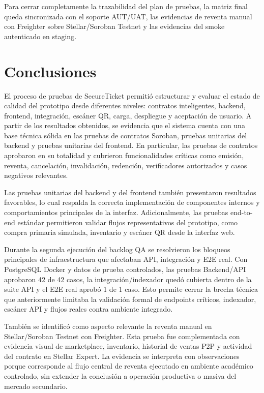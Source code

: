 \documentclass[12pt,letterpaper]{article}
\newcommand{\NombreProyecto}{SecureTicket}
\begin{document}
Para cerrar completamente la trazabilidad del plan de pruebas, la matriz final queda sincronizada con el soporte AUT/UAT, las evidencias de reventa manual con Freighter sobre Stellar/Soroban Testnet y las evidencias del smoke autenticado en staging.


\section{Conclusiones}

El proceso de pruebas de \NombreProyecto{} permitió estructurar y evaluar el estado de calidad del prototipo desde diferentes niveles: contratos inteligentes, backend, frontend, integración, escáner QR, carga, despliegue y aceptación de usuario. A partir de los resultados obtenidos, se evidencia que el sistema cuenta con una base técnica sólida en las pruebas de contratos Soroban, pruebas unitarias del backend y pruebas unitarias del frontend. En particular, las pruebas de contratos aprobaron en su totalidad y cubrieron funcionalidades críticas como emisión, reventa, cancelación, invalidación, redención, verificadores autorizados y casos negativos relevantes.

Las pruebas unitarias del backend y del frontend también presentaron resultados favorables, lo cual respalda la correcta implementación de componentes internos y comportamientos principales de la interfaz. Adicionalmente, las pruebas end-to-end estándar permitieron validar flujos representativos del prototipo, como compra primaria simulada, inventario y escáner QR desde la interfaz web.

Durante la segunda ejecución del backlog QA se resolvieron los bloqueos principales de infraestructura que afectaban API, integración y E2E real. Con PostgreSQL Docker y datos de prueba controlados, las pruebas Backend/API aprobaron 42 de 42 casos, la integración/indexador quedó cubierta dentro de la suite API y el E2E real aprobó 1 de 1 caso. Esto permite cerrar la brecha técnica que anteriormente limitaba la validación formal de endpoints críticos, indexador, escáner API y flujos reales contra ambiente integrado.

También se identificó como aspecto relevante la reventa manual en Stellar/Soroban Testnet con Freighter. Esta prueba fue complementada con evidencia visual de marketplace, inventario, historial de ventas P2P y actividad del contrato en Stellar Expert. La evidencia se interpreta con observaciones porque corresponde al flujo central de reventa ejecutado en ambiente académico controlado, sin extender la conclusión a operación productiva o masiva del mercado secundario.
\end{document}
